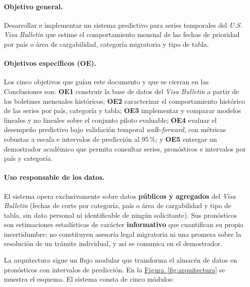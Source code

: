 \documentclass[12pt,letterpaper]{report}
\begin{document}
\paragraph{Objetivo general.} Desarrollar e implementar un sistema predictivo para series
temporales del \textit{U.S. Visa Bulletin} que estime el comportamiento mensual de las
fechas de prioridad por país o área de cargabilidad, categoría migratoria y tipo de tabla.

\paragraph{Objetivos específicos (OE).} Los cinco objetivos que guían este documento y que se
cierran en las Conclusiones son: \textbf{OE1} construir la base de datos del \textit{Visa
Bulletin} a partir de los boletines mensuales históricos; \textbf{OE2} caracterizar el
comportamiento histórico de las series por país, categoría y tabla; \textbf{OE3} implementar
y comparar modelos lineales y no lineales sobre el conjunto piloto evaluable; \textbf{OE4}
evaluar el desempeño predictivo bajo validación temporal \textit{walk-forward}, con métricas
robustas a escala e intervalos de predicción al $95$\,\%; y \textbf{OE5} entregar un
demostrador académico que permita consultar series, pronósticos e intervalos por país y
categoría.

\paragraph{Uso responsable de los datos.} El sistema opera exclusivamente sobre datos
\textbf{públicos y agregados} del \textit{Visa Bulletin} (fechas de corte por categoría,
país o área de cargabilidad y tipo de tabla, sin dato personal ni identificable de ningún
solicitante). Sus pronósticos son estimaciones estadísticas de carácter \textbf{informativo}
que cuantifican su propia incertidumbre; no constituyen asesoría legal migratoria ni una
promesa sobre la resolución de un trámite individual, y así se comunica en el demostrador.

La arquitectura sigue un flujo modular que transforma el almacén de datos en
pronósticos con intervalos de predicción. En la \hyperref[fig:arquitectura]{Figura~\ref*{fig:arquitectura}} se
muestra el esquema. El sistema consta de cinco módulos:
\end{document}

